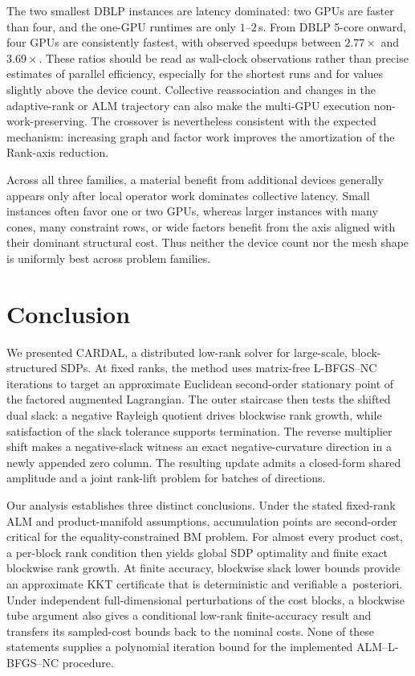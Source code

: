 \documentclass[11pt]{article}
\theoremstyle{definition}
\theoremstyle{remark}
\newcommand{\name}{\textsc{CARDAL}\xspace}
\begin{document}
The two smallest DBLP instances are latency dominated: two GPUs are faster
than four, and the one-GPU runtimes are only $1$--$2$\,s.  From DBLP 5-core
onward, four GPUs are consistently fastest, with observed speedups between
$2.77\times$ and $3.69\times$.  These ratios should be read as wall-clock
observations rather than precise estimates of parallel efficiency, especially
for the shortest runs and for values slightly above the device count.
Collective reassociation and changes in the adaptive-rank or ALM trajectory
can also make the multi-GPU execution non-work-preserving.  The crossover is
nevertheless consistent with the expected mechanism: increasing graph and
factor work improves the amortization of the Rank-axis reduction.

Across all three families, a material benefit from additional
devices generally appears only after local operator work dominates collective
latency.  Small instances often favor one or two GPUs, whereas larger
instances with many cones, many constraint rows, or wide factors benefit from
the axis aligned with their dominant structural cost.  Thus neither the
device count nor the mesh shape is uniformly best across problem families.

\section{Conclusion}
\label{sec:conclusion}

We presented \name{}, a distributed low-rank solver for large-scale,
block-structured SDPs.  At fixed ranks, the method uses matrix-free
L-BFGS--NC iterations to target an approximate Euclidean second-order
stationary point of the factored augmented Lagrangian.  The outer staircase
then tests the shifted dual slack: a negative Rayleigh quotient drives
blockwise rank growth, while satisfaction of the slack tolerance supports
termination.  The reverse multiplier shift makes a negative-slack witness an
exact negative-curvature direction in a newly appended zero column.  The
resulting update admits a closed-form shared amplitude and a joint rank-lift
problem for batches of directions.

Our analysis establishes three distinct conclusions.  Under the
stated fixed-rank ALM and product-manifold assumptions, accumulation points
are second-order critical for the equality-constrained BM problem.  For
almost every product cost, a per-block rank condition then yields global SDP
optimality and finite exact blockwise rank growth.  At finite accuracy,
blockwise slack lower bounds provide an approximate KKT certificate that is
deterministic and verifiable \mbox{a posteriori}.
Under independent full-dimensional perturbations of the cost blocks, a
blockwise tube argument also gives a conditional low-rank
finite-accuracy result and transfers its sampled-cost bounds back to the
nominal costs.  None of these statements supplies a polynomial iteration
bound for the implemented ALM--L-BFGS--NC procedure.
\end{document}
